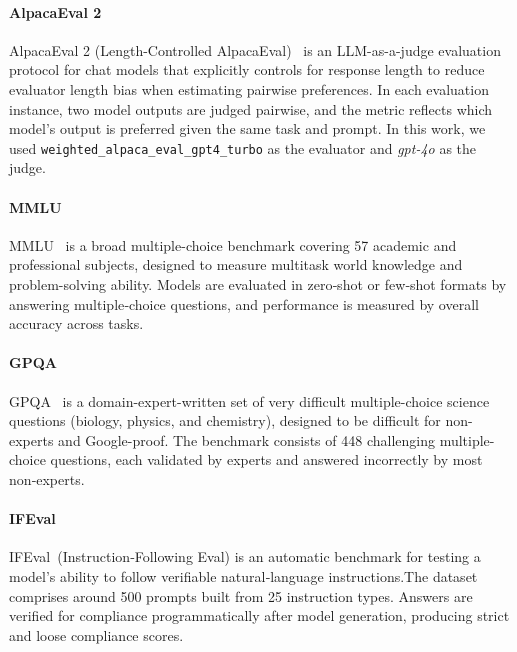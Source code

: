 \documentclass[11pt, letterpaper]{template}
\theoremstyle{plain}
\theoremstyle{definition}
\theoremstyle{remark}
\begin{document}
\paragraph{AlpacaEval 2} AlpacaEval 2 (Length-Controlled AlpacaEval)~\citep{dubois2024alpacaeval2} is an LLM-as-a-judge evaluation protocol for chat models that explicitly controls for response length to reduce evaluator length bias when estimating pairwise preferences. In each evaluation instance, two model outputs are judged pairwise, and the metric reflects which model’s output is preferred given the same task and prompt. In this work, we used \texttt{weighted\_alpaca\_eval\_gpt4\_turbo} as the evaluator and \textit{gpt-4o} as the judge.

\paragraph{MMLU} MMLU~\citep{hendrycks2021mmlu} is a broad multiple-choice benchmark covering 57 academic and professional subjects, designed to measure multitask world knowledge and problem-solving ability. Models are evaluated in zero‑shot or few‑shot formats by answering multiple‑choice questions, and performance is measured by overall accuracy across tasks.

\paragraph{GPQA} GPQA~\citep{rein2023gpqa} is a domain-expert-written set of very difficult multiple-choice science questions (biology, physics, and chemistry), designed to be difficult for non-experts and Google-proof. The benchmark consists of 448 challenging multiple-choice questions, each validated by experts and answered incorrectly by most non‑experts.

\paragraph{IFEval} IFEval~\citep{zhou2023ifeval}(Instruction‑Following Eval) is an automatic benchmark for testing a model’s ability to follow verifiable natural‑language instructions.The dataset comprises around 500 prompts built from 25 instruction types. Answers are verified for compliance programmatically after model generation, producing strict and loose compliance scores. 
\end{document}

